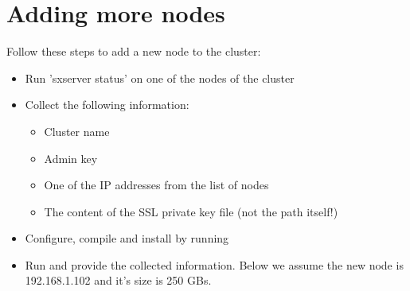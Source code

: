 \section*{Adding more nodes}

Follow these steps to add a new node to the cluster:
\begin{itemize}
    \item Run 'sxserver status' on one of the nodes of the cluster
    \item Collect the following information:
	\begin{itemize}
	    \item Cluster name
	    \item Admin key
	    \item One of the IP addresses from the list of nodes
	    \item The content of the SSL private key file (not the path itself!)
	\end{itemize}
    \item Configure, compile and install \SX by running
    \item Run  and provide the collected information.
	  Below we assume the new node is 192.168.1.102 and it's size is 250 GBs.
\end{itemize}

